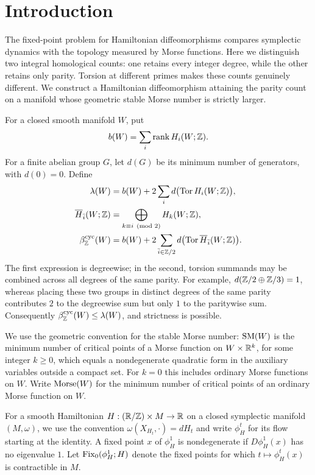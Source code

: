 \section{Introduction}
\label{sec:introduction}

The fixed-point problem for Hamiltonian diffeomorphisms compares
symplectic dynamics with the topology measured by Morse functions.
Here we distinguish two integral homological counts: one retains every
integer degree, while the other retains only parity. Torsion at different
primes makes these counts genuinely different. We construct a
Hamiltonian diffeomorphism attaining the parity count on a manifold
whose geometric stable Morse number is strictly larger.

For a closed smooth manifold $W$, put
\[
 b(W)=\sum_i\operatorname{rank} H_i(W;\mathbb Z).
\]
For a finite abelian group $G$, let $d(G)$ be its minimum number of
generators, with $d(0)=0$. Define
\begin{align}
 \lambda(W)&=b(W)+2\sum_i d\bigl(\operatorname{Tor} H_i(W;\mathbb Z)\bigr),
 \label{eq:lambda}\\
 \overline H_{\bar i}(W;\mathbb Z)&=
       \bigoplus_{k\equiv i\pmod 2}H_k(W;\mathbb Z),\nonumber\\
 \beta_{\mathbb Z}^{\mathrm{cyc}}(W)&=b(W)+
       2\sum_{\bar i\in\mathbb Z/2}
       d\bigl(\operatorname{Tor}\overline H_{\bar i}(W;\mathbb Z)\bigr).
 \label{eq:cyclic}
\end{align}
The first expression is degreewise; in the second, torsion summands
may be combined across all degrees of the same parity.
For example, $d(\mathbb Z/2\oplus\mathbb Z/3)=1$, whereas placing these two
groups in distinct degrees of the same parity contributes $2$ to the
degreewise sum but only $1$ to the paritywise sum.
Consequently $\beta_{\mathbb Z}^{\mathrm{cyc}}(W)\leq\lambda(W)$,
and strictness is possible.

We use the geometric convention for the stable Morse number:
$\operatorname{SM}(W)$ is the minimum number of critical points of a Morse function
on $W\times\mathbb R^k$, for some integer $k\geq0$, which equals a
nondegenerate quadratic form in the auxiliary variables outside a
compact set. For $k=0$ this includes ordinary Morse functions on $W$.
Write $\operatorname{Morse}(W)$ for the minimum number of critical points of an
ordinary Morse function on $W$.

For a smooth Hamiltonian $H:(\mathbb R/\mathbb Z)\times M\to\mathbb R$ on a closed
symplectic manifold $(M,\omega)$, we use the convention
$\omega(X_{H_t},\cdot)=dH_t$ and write $\phi_H^t$ for its flow
starting at the identity. A fixed point $x$ of $\phi_H^1$ is
nondegenerate if $D\phi_H^1(x)$ has no eigenvalue $1$.
Let $\operatorname{Fix}_0(\phi_H^1;H)$ denote the fixed points for which
$t\mapsto\phi_H^t(x)$ is contractible in $M$.

